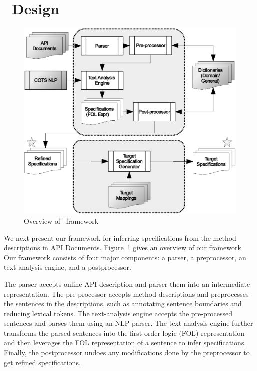 \section{\tool\ Design}
\label{sec:approach}

\begin{figure}
	\centering
		\includegraphics[scale=0.45]{approach.eps}
	\caption{Overview of \tool\ framework}
	\label{fig:approachOverview}
\end{figure}

We next present our framework for inferring specifications from the method descriptions in API Documents. Figure~\ref{fig:approachOverview} gives an overview of our framework. Our framework consists of four major components: a parser, a preprocessor, an text-analysis engine, and a postprocessor.

The parser accepts online API description and parser them into an intermediate representation. The pre-processor accepts method descriptions and preprocesses the sentences in the descriptions, such as annotating sentence boundaries and reducing lexical tokens. 
The text-analysis engine accepts the pre-processed sentences and parses them using an NLP parser. The text-analysis engine further transforms the parsed sentences into the first-order-logic (FOL) representation and then leverages the FOL representation of a sentence to infer specifications. Finally, the postprocessor undoes any modifications done by the preprocessor to get refined specifications.

